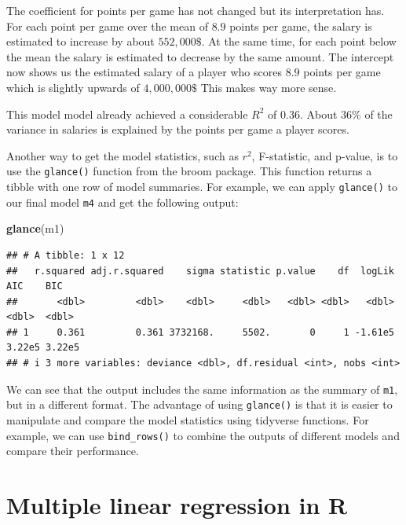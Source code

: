 \documentclass[
]{book}
\newenvironment{Shaded}{\begin{snugshade}}{\end{snugshade}}
\newcommand{\FunctionTok}[1]{\textcolor[rgb]{0.13,0.29,0.53}{\textbf{#1}}}
\newcommand{\NormalTok}[1]{#1}
\begin{document}
The coefficient for points per game has not changed but its interpretation has.
For each point per game over the mean of \(8.9\) points per game, the salary is
estimated to increase by about \(552,000\$\). At the same time, for each point
below the mean the salary is estimated to decrease by the same amount.
The intercept now shows us the estimated salary of a player who scores \(8.9\)
points per game which is slightly upwards of \(4,000,000\$\) This makes way more
sense.

This model model already achieved a considerable \(R^2\) of \(0.36\). About \(36\%\)
of the variance in salaries is explained by the points per game a player scores.

Another way to get the model statistics, such as \(r^2\), F-statistic, and p-value, is to use the \texttt{glance()} function from the broom package. This function returns a tibble with one row of model summaries. For example, we can apply \texttt{glance()} to our final model \texttt{m4} and get the following output:

\begin{Shaded}
\begin{Highlighting}[]
\FunctionTok{glance}\NormalTok{(m1)}
\end{Highlighting}
\end{Shaded}

\begin{verbatim}
## # A tibble: 1 x 12
##   r.squared adj.r.squared    sigma statistic p.value    df  logLik    AIC    BIC
##       <dbl>         <dbl>    <dbl>     <dbl>   <dbl> <dbl>   <dbl>  <dbl>  <dbl>
## 1     0.361         0.361 3732168.     5502.       0     1 -1.61e5 3.22e5 3.22e5
## # i 3 more variables: deviance <dbl>, df.residual <int>, nobs <int>
\end{verbatim}

We can see that the output includes the same information as the summary of \texttt{m1}, but in a different format. The advantage of using \texttt{glance()} is that it is easier to manipulate and compare the model statistics using tidyverse functions. For example, we can use \texttt{bind\_rows()} to combine the outputs of different models and compare their performance.

\hypertarget{multiple-linear-regression-in-r}{%
\section{Multiple linear regression in R}\label{multiple-linear-regression-in-r}}
\end{document}
